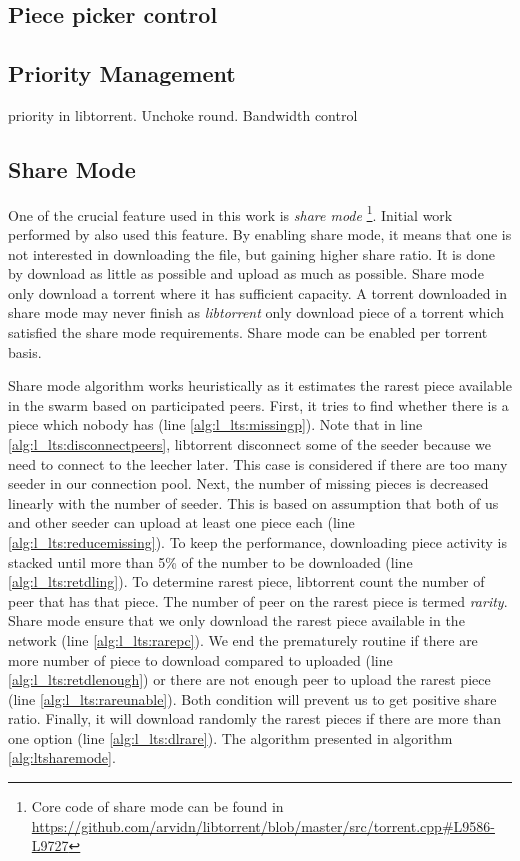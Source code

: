 \subsection{Piece picker control}

\subsection{Priority Management}
priority in libtorrent. Unchoke round. Bandwidth control

\subsection{Share Mode}
\label{section:sharemode}
One of the crucial feature used in this work is \textit{share mode} \footnote{Core code of share mode can be found in \url{https://github.com/arvidn/libtorrent/blob/master/src/torrent.cpp\#L9586-L9727}}. Initial work performed by \citeauthor{2015:creditmining:capota} also used this feature\cite{2015:creditmining:capota}. By enabling share mode, it means that one is not interested in downloading the file, but gaining higher share ratio. It is done by download as little as possible and upload as much as possible. Share mode only download a torrent where it has sufficient capacity. A torrent downloaded in share mode may never finish as \textit{libtorrent} only download piece of a torrent which satisfied the share mode requirements. Share mode can be enabled per torrent basis.

Share mode algorithm works heuristically as it estimates the rarest piece available in the swarm based on participated peers. First, it tries to find whether there is a piece which nobody has (line \ref{alg:l_lts:missingp}). Note that in line \ref{alg:l_lts:disconnectpeers}, libtorrent disconnect some of the seeder because we need to connect to the leecher later. This case is considered if there are too many seeder in our connection pool. Next, the number of missing pieces is decreased linearly with the number of seeder. This is based on assumption that both of us and other seeder can upload at least one piece each (line \ref{alg:l_lts:reducemissing}). To keep the performance, downloading piece activity is stacked until more than 5\% of the number to be downloaded (line \ref{alg:l_lts:retdling}). To determine rarest piece, libtorrent count the number of peer that has that piece. The number of peer on the rarest piece is termed \textit{rarity}. Share mode ensure that we only download the rarest piece available in the network (line \ref{alg:l_lts:rarepc}). We end the prematurely routine if there are more number of piece to download compared to uploaded (line \ref{alg:l_lts:retdlenough}) or there are not enough peer to upload the rarest piece (line \ref{alg:l_lts:rareunable}). Both condition will prevent us to get positive share ratio. Finally, it will download randomly the rarest pieces if there are more than one option (line \ref{alg:l_lts:dlrare}). The algorithm presented in algorithm \ref{alg:ltsharemode}. 

